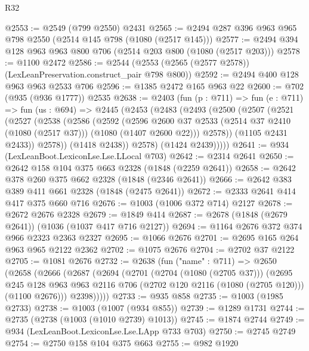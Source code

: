 \begin{lexlean}{R32}
\begin{coremodule}
@2553 := @2549 (@799 @2550) @2431
@2565 := @2494 @287 @396 @963 @965 @798 @2550 (@2514 @145 @798 (@1080 (@2517 @145)))
@2577 := @2494 @394 @128 @963 @963 @800 @706 (@2514 @203 @800 (@1080 (@2517 @203)))
@2578 := @1100 @2472
@2586 := @2544 (@2553 (@2565 (@2577 @2578)) (LexLeanPreservation.construct_pair @798 @800))
@2592 := @2494 @400 @128 @963 @963 @2533 @706
@2596 := @1385 @2472 @165 @963 @22
@2600 := @702 (@935 (@936 @1777)) @2535
@2638 := @2403
    (fun (p : @711) =>
    fun (e : @711) =>
    fun (us : @694) =>
    @2445
      (@2453
        (@2483
          (@2493
            (@2500
              (@2507
                (@2521
                  (@2527
                    (@2538
                      (@2586
                        (@2592
                          (@2596
                            @2600
                            @37
                            @2533
                            (@2514 @37 @2410 (@1080 (@2517 @37)))
                            (@1080 (@1407 @2600 @22)))
                          @2578))
                      (@1105 @2431 @2433))
                    @2578))
                (@1418 @2438))
              @2578)
            (@1424 @2439)))))
@2641 := @934 (LexLeanBoot.LexiconLse.Lse.LLocal @703)
@2642 := @2314 @2641
@2650 := @2642 @158 @104 @375 @663 @2328 (@1848 (@2259 @2641))
@2658 := @2642 @378 @260 @375 @662 @2328 (@1848 (@2346 @2641))
@2666 := @2642 @383 @389 @411 @661 @2328 (@1848 (@2475 @2641))
@2672 := @2333 @2641 @414 @417 @375 @660 @716
@2676 := @1003 (@1006 @372 @714) @2127
@2678 := @2672 @2676 @2328
@2679 := @1849 @414
@2687 := @2678 (@1848 (@2679 @2641)) (@1036 (@1037 @417 @716 @2127))
@2694 := @1164 @2676 @372 @374 @966 @2323 @2363 @2327
@2695 := @1066 @2676
@2701 := @2695 @165 @264 @963 @965 @2122 @2362
@2702 := @1075 @2676
@2704 := @2702 @37 @2122
@2705 := @1081 @2676
@2732 := @2638
    (fun ("name" : @711) =>
    @2650
      (@2658
        (@2666
          (@2687
            (@2694
              (@2701
                (@2704 (@1080 (@2705 @37)))
                (@2695
                  @245
                  @128
                  @963
                  @963
                  @2116
                  @706
                  (@2702 @120 @2116 (@1080 (@2705 @120)))
                  (@1100 @2676)))
              @2398)))))
@2733 := @935 @858
@2735 := @1003 (@1985 @2733)
@2738 := @1003 (@1007 (@934 @855))
@2739 := @1289 @1731
@2744 := @2735 (@2738 (@1003 (@1010 @2739) @1013))
@2745 := @1874 @2744
@2749 := @934 (LexLeanBoot.LexiconLse.Lse.LApp @733 @703)
@2750 := @2745 @2749
@2754 := @2750 @158 @104 @375 @663
@2755 := @982 @1920

\end{coremodule}
\end{lexlean}
